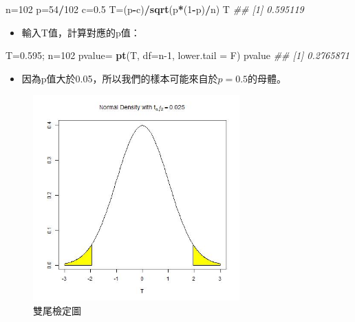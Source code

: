 \documentclass[hyperref,]{ctexart}
\newenvironment{Shaded}{\begin{snugshade}}{\end{snugshade}}
\newcommand{\CommentTok}[1]{\textcolor[rgb]{0.56,0.35,0.01}{\textit{#1}}}
\newcommand{\DataTypeTok}[1]{\textcolor[rgb]{0.13,0.29,0.53}{#1}}
\newcommand{\DecValTok}[1]{\textcolor[rgb]{0.00,0.00,0.81}{#1}}
\newcommand{\FloatTok}[1]{\textcolor[rgb]{0.00,0.00,0.81}{#1}}
\newcommand{\KeywordTok}[1]{\textcolor[rgb]{0.13,0.29,0.53}{\textbf{#1}}}
\newcommand{\NormalTok}[1]{#1}
\newcommand{\OperatorTok}[1]{\textcolor[rgb]{0.81,0.36,0.00}{\textbf{#1}}}
\newcommand{\StringTok}[1]{\textcolor[rgb]{0.31,0.60,0.02}{#1}}
\providecommand{\tightlist}{%
  \setlength{\itemsep}{0pt}\setlength{\parskip}{0pt}}
\begin{document}
\begin{Shaded}
\begin{Highlighting}[]
\NormalTok{n=}\DecValTok{102}
\NormalTok{p=}\DecValTok{54}\OperatorTok{/}\DecValTok{102}
\NormalTok{c=}\FloatTok{0.5}
\NormalTok{T=(p}\OperatorTok{-}\NormalTok{c)}\OperatorTok{/}\KeywordTok{sqrt}\NormalTok{(p}\OperatorTok{*}\NormalTok{(}\DecValTok{1}\OperatorTok{-}\NormalTok{p)}\OperatorTok{/}\NormalTok{n)}
\NormalTok{T}
\CommentTok{## [1] 0.595119}
\end{Highlighting}
\end{Shaded}

\begin{itemize}
\tightlist
\item
  輸入T值，計算對應的p值：
\end{itemize}

\begin{Shaded}
\begin{Highlighting}[]
\NormalTok{T=}\FloatTok{0.595}\NormalTok{; n=}\DecValTok{102}
\NormalTok{pvalue=}\StringTok{ }\KeywordTok{pt}\NormalTok{(T, }\DataTypeTok{df=}\NormalTok{n}\DecValTok{-1}\NormalTok{, }\DataTypeTok{lower.tail =}\NormalTok{ F)}
\NormalTok{pvalue}
\CommentTok{## [1] 0.2765871}
\end{Highlighting}
\end{Shaded}

\begin{itemize}
\tightlist
\item
  因為p值大於0.05，所以我們的樣本可能來自於\(p=0.5\)的母體。
\end{itemize}

\begin{figure}
\centering
\includegraphics[width=\textwidth,height=3.125in]{./Fig/t_alpha1.jpg}
\caption{雙尾檢定圖}
\end{figure}
\end{document}
